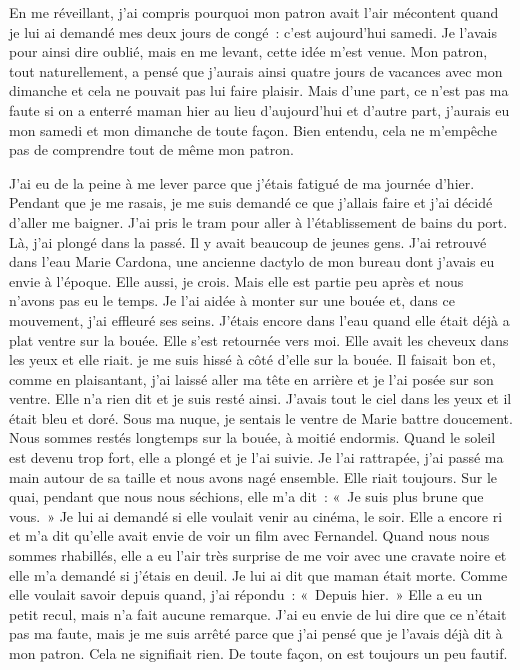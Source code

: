\documentclass[french,twoside]{book} %
\newcommand\chaptercont{} %
\begin{document}
\chaptercont
\noindent En me réveillant, j’ai compris pourquoi mon patron avait l’air mécontent quand je lui ai demandé mes deux jours de congé : c’est aujourd’hui samedi. Je l’avais pour ainsi dire oublié, mais en me levant, cette idée m’est venue. Mon patron, tout naturellement, a pensé que j’aurais ainsi quatre jours de vacances avec mon dimanche et cela ne pouvait pas lui faire plaisir. Mais d’une part, ce n’est pas ma faute si on a enterré maman hier au lieu d’aujourd’hui et d’autre part, j’aurais eu mon samedi et mon dimanche de toute façon. Bien entendu, cela ne m’empêche pas de comprendre tout de même mon patron.\par
J'ai eu de la peine à me lever parce que j’étais fatigué de ma journée d’hier. Pendant que je me rasais, je me suis demandé ce que j’allais faire et j’ai décidé d’aller me baigner. J'ai pris le tram pour aller à l’établissement de bains du port. Là, j’ai plongé dans la passé. Il y avait beaucoup de jeunes gens. J'ai retrouvé dans l’eau Marie Cardona, une ancienne dactylo de mon bureau dont j’avais eu envie à l’époque. Elle aussi, je crois. Mais elle est partie peu après et nous n’avons pas eu le temps. Je l’ai aidée à monter sur une bouée et, dans ce mouvement, j’ai effleuré ses seins. J'étais encore dans l’eau quand elle était déjà a plat ventre sur la bouée. Elle s’est retournée vers moi. Elle avait les cheveux dans les yeux et elle riait. je me suis hissé à côté d’elle sur la bouée. Il faisait bon et, comme en plaisantant, j’ai laissé aller ma tête en arrière et je l’ai posée sur son ventre. Elle n’a rien dit et je suis resté ainsi. J'avais tout le ciel dans les yeux et il était bleu et doré. Sous ma nuque, je sentais le ventre de Marie battre doucement. Nous sommes restés longtemps sur la bouée, à moitié endormis. Quand le soleil est devenu trop fort, elle a plongé et je l’ai suivie. Je l’ai rattrapée, j’ai passé ma main autour de sa taille et nous avons nagé ensemble. Elle riait toujours. Sur le quai, pendant que nous nous séchions, elle m’a dit : « Je suis plus brune que vous. » Je lui ai demandé si elle voulait venir au cinéma, le soir. Elle a encore ri et m’a dit qu’elle avait envie de voir un film avec Fernandel. Quand nous nous sommes rhabillés, elle a eu l’air très surprise de me voir avec une cravate noire et elle m’a demandé si j’étais en deuil. Je lui ai dit que maman était morte. Comme elle voulait savoir depuis quand, j’ai répondu : « Depuis hier. » Elle a eu un petit recul, mais n’a fait aucune remarque. J'ai eu envie de lui dire que ce n’était pas ma faute, mais je me suis arrêté parce que j’ai pensé que je l’avais déjà dit à mon patron. Cela ne signifiait rien. De toute façon, on est toujours un peu fautif.\par
\end{document}
